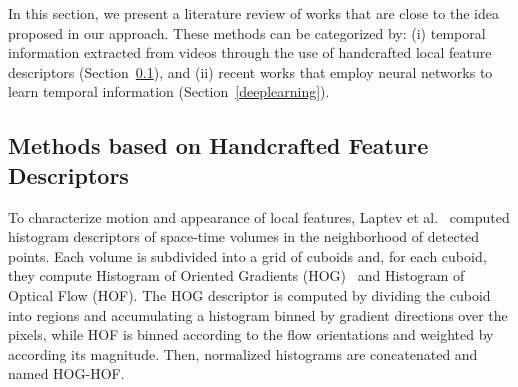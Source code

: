 \documentclass[10pt,conference]{IEEEtran}
\begin{document}

In this section, we present a literature review of works that are close to the idea proposed in our approach. These methods can be categorized by: (i) temporal information extracted from videos through the use of handcrafted local feature descriptors (Section~\ref{handcrafted}), and (ii) recent works that employ neural networks to learn temporal information (Section~\ref{deeplearning}).

\subsection{Methods based on Handcrafted Feature Descriptors}\label{handcrafted}


To characterize motion and appearance of local features, Laptev et al.~\cite{Laptev:2008} computed histogram descriptors of space-time volumes in the neighborhood of detected points. Each volume is subdivided into a grid of cuboids and, for each cuboid, they compute Histogram of Oriented Gradients (HOG)~\cite{Dalal:2005} and Histogram of Optical Flow (HOF). The HOG descriptor is computed by dividing the cuboid into regions and accumulating a histogram binned by gradient directions over the pixels, while HOF is binned according to the flow orientations and weighted by according its magnitude. Then, normalized histograms are concatenated and named HOG-HOF.
\end{document}
